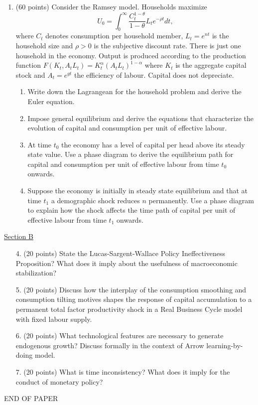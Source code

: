 \documentclass[12pt,a4paper]{article}
\begin{document}
\begin{enumerate}
\item   (60 points) Consider the Ramsey model.
  Households maximize
  \[U_{0}=\int_{0}^{\infty}\frac{C_{t}^{1-\theta}}{1-\theta}L_{t}e^{-\rho
    t}dt,\] 
where $C_{t}$ denotes consumption per household member,
  $L_{t}=e^{nt}$ is the household size and $\rho>0$ is the subjective
  discount rate. There is just one household in the economy. Output is
  produced according to the production function
  $F(K_{t},A_{t}L_{t})=K_{t}^{\alpha}(A_{t}L_{t})^{1-\alpha}$ where $K_{t}$ is
  the aggregate capital stock and $A_{t}=e^{gt}$ the efficiency of
  labour. Capital does not depreciate.
  \begin{enumerate}
  \item Write down the Lagrangean for the household problem and derive
    the Euler equation.
  \item Impose general equilibrium and derive the equations that
    characterize the evolution of capital  and consumption per unit of
    effective labour.
  \item At time $t_{0}$ the economy has a level of capital per head
    above its steady state value. Use a phase diagram to derive the
    equilibrium path for capital and consumption per unit of effective
    labour from time $t_{0}$ onwards.
  \item Suppose the economy is initially in steady state equilibrium
    and that at time $t_{1}$ a demographic shock reduces $n$
    permanently. Use a phase diagram to explain how the shock affects
    the time path of capital per unit of effective labour from time
    $t_{1}$ onwards.  
\end{enumerate}
\end{enumerate}


\bigskip

\underline {Section B}
\begin{enumerate}
\item [4.]   (20 points) State the Lucas-Sargent-Wallace Policy Ineffectiveness
  Proposition? What does it imply about the usefulness of
  macroeconomic stabilization?
\item [5.] (20 points) Discuss how the interplay of the consumption
  smoothing and consumption tilting motives shapes the response of
  capital accumulation to a permanent total factor productivity shock in
  a Real Business Cycle model with fixed labour supply.
\item [6.] (20 points) What technological features are necessary to
  generate endogenous growth? Discuss formally in the context of Arrow
  learning-by-doing model.
\item [7.] (20 points) What is time inconsistency? What does it imply
  for the conduct of monetary policy?
\end{enumerate}
\begin{center}
  END OF PAPER
\end{center}
\end{document}
